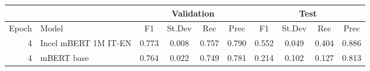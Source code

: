 \begin{tabular}{rl|cccc|cccc}
    \hline
                  &                    &  \multicolumn{4}{c|}{Validation}              & \multicolumn{4}{c}{Test} \\
    \hline
            Epoch &              Model &      F1 &      St.Dev &   Rec & Prec &       F1 &       St.Dev &  Rec   &  Prec \\
    \hline
  4 & Incel mBERT 1M IT-EN &   0.773 &          0.008 &    0.757 &     0.790 &    0.552 &           0.049 &     0.404 &      0.886 \\
  4 &           mBERT base &   0.764 &          0.022 &    0.749 &     0.781 &    0.214 &           0.102 &     0.127 &      0.813 \\
\hline
\end{tabular}
